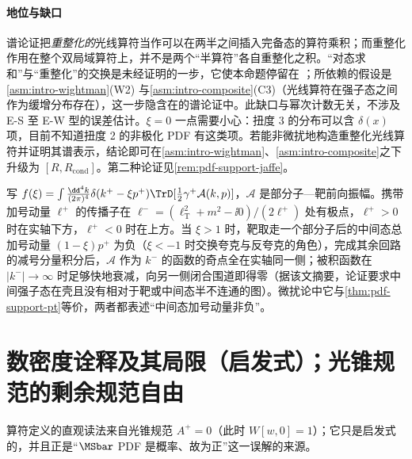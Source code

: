 \paragraph{地位与缺口}
谱论证把\emph{重整化的}光线算符当作可以在两半之间插入完备态的算符乘积；而重整化作用在整个双局域算符上，并不是两个“半算符”各自重整化之积。“对态求和”与“重整化”的交换是未经证明的一步，它使本命题停留在 \tagA；所依赖的假设是\cref{asm:intro-wightman}(W2) 与\cref{asm:intro-composite}(C3)（光线算符在强子态之间作为缓增分布存在），这一步隐含在\cite[第~6.9.3~节]{Collins2011}的谱论证中。此缺口与幂次计数无关，不涉及 E-S 至 E-W 型的误差估计。$\xi=0$ 一点需要小心：扭度 3 的分布可以含 $\delta(x)$ 项，目前不知道扭度 2 的非极化 PDF 有这类项。若能非微扰地构造重整化光线算符并证明其谱表示，结论即可在\cref{asm:intro-wightman}、\cref{asm:intro-composite}之下升级为 $[R,R_{\mathrm{cond}}]$。第二种论证见\cref{rem:pdf-support-jaffe}。

\begin{remark}[支撑的第二种论证：$k^-$ 极点]\label{rem:pdf-support-jaffe}
写 $f(\xi)=\int\frac{\dd^4k}{(2\pi)^4}\delta(k^+-\xi p^+)\TrD[\frac12\gamma^+\mathcal A(k,p)]$，$\mathcal A$ 是部分子—靶前向振幅。携带加号动量 $\ell^+$ 的传播子在 $\ell^-=(\bm\ell_{\mathrm T}^2+m^2-\ii0)/(2\ell^+)$ 处有极点，$\ell^+>0$ 时在实轴下方，$\ell^+<0$ 时在上方。当 $\xi>1$ 时，靶取走一个部分子后的中间态总加号动量 $(1-\xi)p^+$ 为负（$\xi<-1$ 时交换夸克与反夸克的角色），完成其余回路的减号分量积分后，$\mathcal A$ 作为 $k^-$ 的函数的奇点全在实轴同一侧；被积函数在 $|k^-|\to\infty$ 时足够快地衰减，向另一侧闭合围道即得零\cite{Jaffe1983}（据该文摘要，论证要求中间强子态在壳且没有相对于靶或中间态半不连通的图）。微扰论中它与\cref{thm:pdf-support-pt}等价，两者都表述“中间态加号动量非负”。
\end{remark}

\section{数密度诠释及其局限（启发式）；光锥规范的剩余规范自由}\label{sec:pdf-interpretation}

算符定义的直观读法来自光锥规范 $A^+=0$（此时 $W[w,0]=1$）；它只是启发式的，并且正是“$\MSbar$ PDF 是概率、故为正”这一误解的来源。

